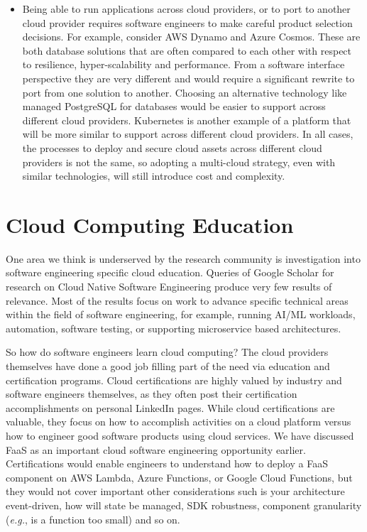 \documentclass[conference]{IEEEtran}
\begin{document}
\begin{itemize}
	\item Being able to run applications across cloud providers, or to port to another cloud provider requires software engineers to make careful product selection decisions.  For example, consider AWS Dynamo and Azure Cosmos.  These are both database solutions that are often compared to each other with respect to resilience, hyper-scalability and performance.  From a software interface perspective they are very different and would require a significant rewrite to port from one solution to another.  Choosing an alternative technology like managed PostgreSQL for databases would be easier to support across different cloud providers.  Kubernetes is another example of a platform that will be more similar to support across different cloud providers.  In all cases, the processes to deploy and secure cloud assets across different cloud providers is not the same, so adopting a multi-cloud strategy, even with similar technologies, will still introduce cost and complexity.
\end{itemize}  

\section{Cloud Computing Education}
One area we think is underserved by the research community is investigation into software engineering specific cloud education.  Queries of Google Scholar\cite{GoogleScolar} for research on Cloud Native Software Engineering produce very few results of relevance.  Most of the results focus on work to advance specific technical areas within the field of software engineering, for example, running AI/ML workloads, automation, software testing, or supporting microservice based architectures.  

So how do software engineers learn cloud computing?  The cloud providers themselves have done a good job filling part of the need via education and certification programs.  Cloud certifications are highly valued by industry and software engineers themselves, as they often post their certification accomplishments on personal LinkedIn pages. While cloud certifications are valuable, they focus on how to accomplish activities on a cloud platform versus how to engineer good software products using cloud services.  We have discussed FaaS as an important cloud software engineering opportunity earlier. Certifications would enable engineers to understand how to deploy a FaaS component on AWS Lambda, Azure Functions, or Google Cloud Functions, but they would not cover important other considerations such is your architecture event-driven, how will state be managed, SDK robustness, component granularity ({\em e.g.}, is a function too small) and so on.
\end{document}
